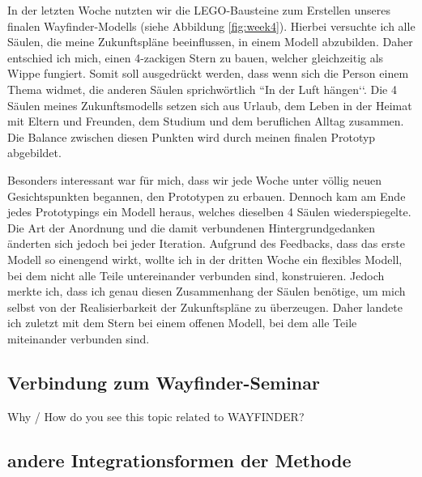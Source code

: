 In der letzten Woche nutzten wir die LEGO-Bausteine zum Erstellen unseres finalen Wayfinder-Modells (siehe Abbildung \ref{fig:week4}). Hierbei versuchte ich alle Säulen, die meine Zukunftspläne beeinflussen, in einem Modell abzubilden. Daher entschied ich mich, einen 4-zackigen Stern zu bauen, welcher gleichzeitig als Wippe fungiert. Somit soll ausgedrückt werden, dass wenn sich die Person einem Thema widmet, die anderen Säulen sprichwörtlich ``In der Luft hängen‘‘. Die 4 Säulen meines Zukunftsmodells setzen sich aus Urlaub, dem Leben in der Heimat mit Eltern und Freunden, dem Studium und dem beruflichen Alltag zusammen. Die Balance zwischen diesen Punkten wird durch meinen finalen Prototyp abgebildet. \newline

Besonders interessant war für mich, dass wir jede Woche unter völlig neuen Gesichtspunkten begannen, den Prototypen zu erbauen. Dennoch kam am Ende jedes Prototypings ein Modell heraus, welches dieselben 4 Säulen wiederspiegelte. Die Art der Anordnung und die damit verbundenen Hintergrundgedanken änderten sich jedoch bei jeder Iteration. Aufgrund des Feedbacks, dass das erste Modell so einengend wirkt, wollte ich in der dritten Woche ein flexibles Modell, bei dem nicht alle Teile untereinander verbunden sind, konstruieren. Jedoch merkte ich, dass ich genau diesen Zusammenhang der Säulen benötige, um mich selbst von der Realisierbarkeit der Zukunftspläne zu überzeugen. Daher landete ich zuletzt mit dem Stern bei einem offenen Modell, bei dem alle Teile miteinander verbunden sind.


\subsection{Verbindung zum Wayfinder-Seminar}
Why / How do you see this topic related to WAYFINDER?

\subsection{andere Integrationsformen der Methode}

